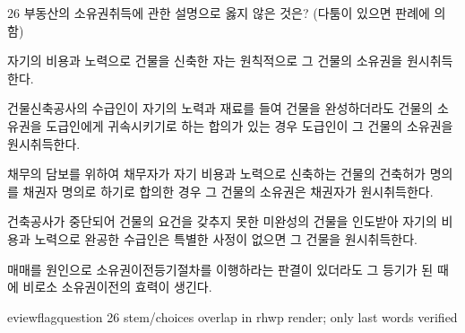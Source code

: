 \begin{question}{26}
부동산의 소유권취득에 관한 설명으로 옳지 않은 것은? (다툼이 있으면 판례에 의함)
\begin{choices}
  \item 자기의 비용과 노력으로 건물을 신축한 자는 원칙적으로 그 건물의 소유권을 원시취득한다.
  \item 건물신축공사의 수급인이 자기의 노력과 재료를 들여 건물을 완성하더라도 건물의 소유권을 도급인에게 귀속시키기로 하는 합의가 있는 경우 도급인이 그 건물의 소유권을 원시취득한다.
  \item 채무의 담보를 위하여 채무자가 자기 비용과 노력으로 신축하는 건물의 건축허가 명의를 채권자 명의로 하기로 합의한 경우 그 건물의 소유권은 채권자가 원시취득한다.
  \item 건축공사가 중단되어 건물의 요건을 갖추지 못한 미완성의 건물을 인도받아 자기의 비용과 노력으로 완공한 수급인은 특별한 사정이 없으면 그 건물을 원시취득한다.
  \item 매매를 원인으로 소유권이전등기절차를 이행하라는 판결이 있더라도 그 등기가 된 때에 비로소 소유권이전의 효력이 생긴다.
\end{choices}

eviewflag{question 26 stem/choices overlap in rhwp render; only last words verified}
\end{question}
